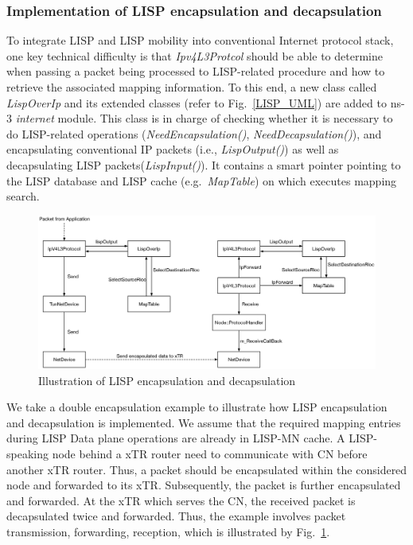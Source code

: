 \subsubsection{Implementation of LISP encapsulation and decapsulation}
To integrate LISP and LISP mobility into conventional Internet protocol stack, one key technical difficulty is that \emph{Ipv4L3Protcol} should be able to determine when passing a packet being processed to LISP-related procedure and how to retrieve the associated mapping information. To this end, a new class called \emph{LispOverIp} and its extended classes (refer to Fig.~\ref{LISP_UML}) are added to ns-3 \emph{internet} module. This class is in charge of checking whether it is necessary to do LISP-related operations (\emph{NeedEncapsulation()}, \emph{NeedDecapsulation()}), and encapsulating conventional IP packets (i.e., \emph{LispOutput()}) as well as decapsulating LISP packets(\emph{LispInput()}). It contains a smart pointer pointing to the LISP database and LISP cache (e.g.~\emph{MapTable}) on which executes mapping search.
\begin{figure}[!t]
	\centering
	\includegraphics[width=\textwidth]{Pics/ns3_lisp_data_plane.eps}
	\caption{Illustration of LISP encapsulation and decapsulation}
	\label{fig:ns3-lisp-data-plane}
\end{figure}

We take a double encapsulation example to illustrate how LISP encapsulation and decapsulation is implemented. We assume that the required mapping entries during LISP Data plane operations are already in LISP-MN cache. A LISP-speaking node behind a xTR router need to communicate with CN before another xTR router. Thus, a packet should be encapsulated within the considered node and forwarded to its xTR. Subsequently, the packet is further encapsulated and forwarded. At the xTR which serves the CN, the received packet is decapsulated twice and forwarded. Thus, the example involves packet transmission, forwarding, reception, which is illustrated by Fig.~\ref{fig:ns3-lisp-data-plane}. 

